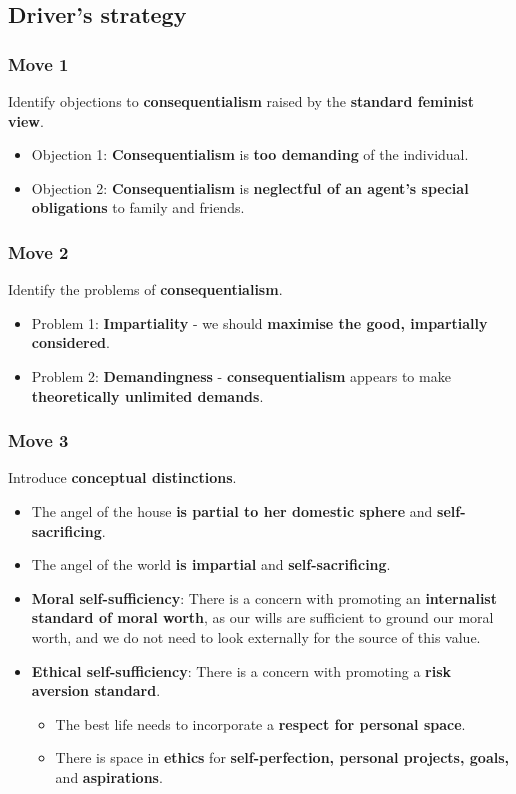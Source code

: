 \documentclass[11pt]{article}
\begin{document}
 \newpage
\subsection{Driver's strategy}
\label{sec:org67b247f}

\subsubsection{Move 1}
\label{sec:orgc497d52}
Identify objections to \textbf{consequentialism} raised by the \textbf{standard feminist view}.
\begin{itemize}
\item Objection 1: \textbf{Consequentialism} is \textbf{too demanding} of the individual.
\item Objection 2: \textbf{Consequentialism} is \textbf{neglectful of an agent's special obligations} to family and friends.
\end{itemize}
\subsubsection{Move 2}
\label{sec:orgc0d7bbf}
Identify the problems of \textbf{consequentialism}.
\begin{itemize}
\item Problem 1: \textbf{Impartiality} - we should \textbf{maximise the good, impartially considered}.
\item Problem 2: \textbf{Demandingness} - \textbf{consequentialism} appears to make \textbf{theoretically unlimited demands}.
\end{itemize}
\subsubsection{Move 3}
\label{sec:org87594da}
Introduce \textbf{conceptual distinctions}.
\begin{itemize}
\item The angel of the house \textbf{is partial to her domestic sphere} and \textbf{self-sacrificing}.
\item The angel of the world \textbf{is impartial} and \textbf{self-sacrificing}.
\item \textbf{Moral self-sufficiency}: There is a concern with promoting an \textbf{internalist standard of moral worth}, as our wills are sufficient to ground our moral worth, and we do not need to look externally for the source of this value.
\item \textbf{Ethical self-sufficiency}: There is a concern with promoting a \textbf{risk aversion standard}.
\begin{itemize}
\item The best life needs to incorporate a \textbf{respect for personal space}.
\item There is space in \textbf{ethics} for \textbf{self-perfection, personal projects, goals,} and \textbf{aspirations}.
\end{itemize}
\end{itemize}
\end{document}
